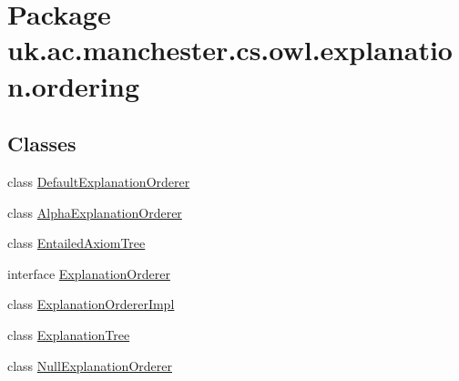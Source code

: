 \hypertarget{namespaceuk_1_1ac_1_1manchester_1_1cs_1_1owl_1_1explanation_1_1ordering}{\section{Package uk.\-ac.\-manchester.\-cs.\-owl.\-explanation.\-ordering}
\label{namespaceuk_1_1ac_1_1manchester_1_1cs_1_1owl_1_1explanation_1_1ordering}
}
\subsection*{Classes}
\begin{DoxyCompactItemize}
\item 
class \hyperlink{classuk_1_1ac_1_1manchester_1_1cs_1_1owl_1_1explanation_1_1ordering_1_1_default_explanation_orderer}{Default\-Explanation\-Orderer}
\item 
class \hyperlink{classuk_1_1ac_1_1manchester_1_1cs_1_1owl_1_1explanation_1_1ordering_1_1_alpha_explanation_orderer}{Alpha\-Explanation\-Orderer}
\item 
class \hyperlink{classuk_1_1ac_1_1manchester_1_1cs_1_1owl_1_1explanation_1_1ordering_1_1_entailed_axiom_tree}{Entailed\-Axiom\-Tree}
\item 
interface \hyperlink{interfaceuk_1_1ac_1_1manchester_1_1cs_1_1owl_1_1explanation_1_1ordering_1_1_explanation_orderer}{Explanation\-Orderer}
\item 
class \hyperlink{classuk_1_1ac_1_1manchester_1_1cs_1_1owl_1_1explanation_1_1ordering_1_1_explanation_orderer_impl}{Explanation\-Orderer\-Impl}
\item 
class \hyperlink{classuk_1_1ac_1_1manchester_1_1cs_1_1owl_1_1explanation_1_1ordering_1_1_explanation_tree}{Explanation\-Tree}
\item 
class \hyperlink{classuk_1_1ac_1_1manchester_1_1cs_1_1owl_1_1explanation_1_1ordering_1_1_null_explanation_orderer}{Null\-Explanation\-Orderer}
\end{DoxyCompactItemize}
